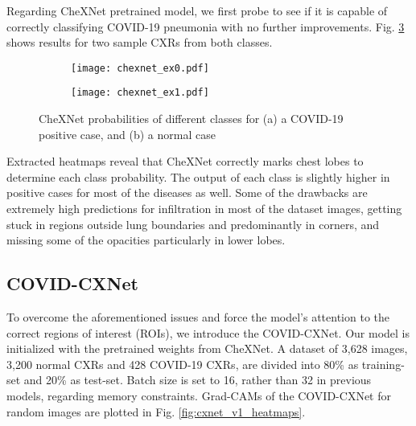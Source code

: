 \documentclass{article}
\begin{document}
Regarding CheXNet pretrained model, we first probe to see if it is capable of correctly classifying COVID-19 pneumonia with no further improvements. Fig. \ref{fig:chexnet_results} shows results for two sample CXRs from both classes.

\begin{figure}[H]
    \begin{subfigure}{\linewidth}
        \centering
        \texttt{[image: chexnet\_ex0.pdf]}
        \caption{}
        \label{fig:chexnet_ex0}
    \end{subfigure}
    \hfill
    \begin{subfigure}{\linewidth}
        \centering
        \texttt{[image: chexnet\_ex1.pdf]}
        \caption{}
        \label{fig:chexnet_ex1}
    \end{subfigure}
\caption{CheXNet probabilities of different classes for (a) a COVID-19 positive case, and (b) a normal case}
\label{fig:chexnet_results}
\end{figure}

\noindent Extracted heatmaps reveal that CheXNet correctly marks chest lobes to determine each class probability. The output of each class is slightly higher in positive cases for most of the diseases as well. Some of the drawbacks are extremely high predictions for infiltration in most of the dataset images, getting stuck in regions outside lung boundaries and predominantly in corners, and missing some of the opacities particularly in lower lobes.


\subsection{COVID-CXNet}
To overcome the aforementioned issues and force the model's attention to the correct regions of interest (ROIs), we introduce the COVID-CXNet. Our model is initialized with the pretrained weights from CheXNet. A dataset of 3,628 images, 3,200 normal CXRs and 428 COVID-19 CXRs, are divided into 80\% as training-set and 20\% as test-set. Batch size is set to 16, rather than 32 in previous models, regarding memory constraints. Grad-CAMs of the COVID-CXNet for random images are plotted in Fig. \ref{fig:cxnet_v1_heatmaps}.
\end{document}
